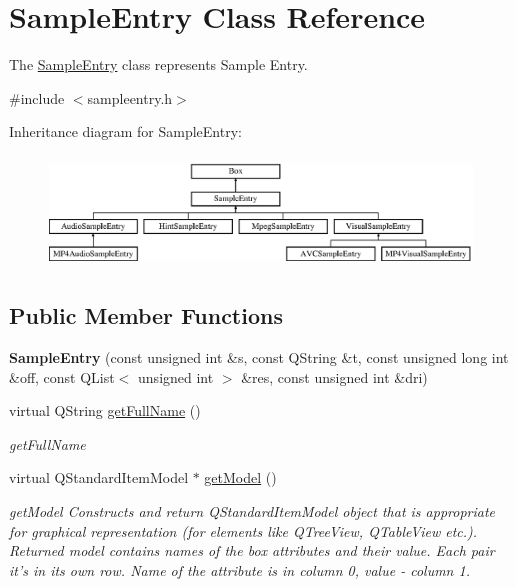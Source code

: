 \hypertarget{class_sample_entry}{\section{Sample\-Entry Class Reference}
\label{class_sample_entry}
}


The \hyperlink{class_sample_entry}{Sample\-Entry} class represents Sample Entry.  




{\ttfamily \#include $<$sampleentry.\-h$>$}

Inheritance diagram for Sample\-Entry\-:\begin{figure}[H]
\begin{center}
\leavevmode
\includegraphics[height=2.947368cm]{class_sample_entry}
\end{center}
\end{figure}
\subsection*{Public Member Functions}
\begin{DoxyCompactItemize}
\item 
\hypertarget{class_sample_entry_a2681da26049fbb806e5324f57fe57d15}{{\bfseries Sample\-Entry} (const unsigned int \&s, const Q\-String \&t, const unsigned long int \&off, const Q\-List$<$ unsigned int $>$ \&res, const unsigned int \&dri)}\label{class_sample_entry_a2681da26049fbb806e5324f57fe57d15}

\item 
virtual Q\-String \hyperlink{class_sample_entry_acbc7081715759b868797ad71b469a63e}{get\-Full\-Name} ()
\begin{DoxyCompactList}\small\item\em get\-Full\-Name \end{DoxyCompactList}\item 
virtual Q\-Standard\-Item\-Model $\ast$ \hyperlink{class_sample_entry_a0babc6ec796f6bf05a5e3e59d635ca79}{get\-Model} ()
\begin{DoxyCompactList}\small\item\em get\-Model Constructs and return Q\-Standard\-Item\-Model object that is appropriate for graphical representation (for elements like Q\-Tree\-View, Q\-Table\-View etc.). Returned model contains names of the box attributes and their value. Each pair it's in its own row. Name of the attribute is in column 0, value -\/ column 1. \end{DoxyCompactList}\end{DoxyCompactItemize}
